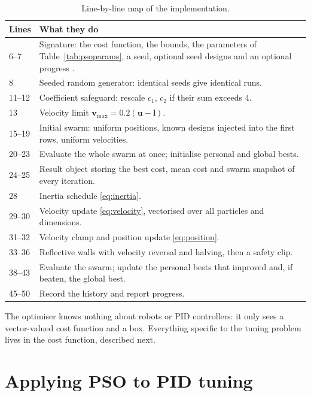 \documentclass[11pt,a4paper]{article}
\newcommand{\code}[1]{\texttt{\detokenize{#1}}}
\begin{document}
\begin{table}[H]
\centering
\small
\begin{tabularx}{\linewidth}{@{}l X@{}}
\toprule
\textbf{Lines} & \textbf{What they do}\\
\midrule
6--7 & Signature: the cost function, the bounds, the parameters of Table~\ref{tab:psoparams}, a seed, optional seed designs \code{x0} and an optional progress \code{callback}.\\
8 & Seeded random generator: identical seeds give identical runs.\\
11--12 & Coefficient safeguard: rescale $c_1$, $c_2$ if their sum exceeds 4.\\
13 & Velocity limit $\bm v_{\max} = 0.2(\bm u - \bm l)$.\\
15--19 & Initial swarm: uniform positions, known designs injected into the first rows, uniform velocities.\\
20--23 & Evaluate the whole swarm at once; initialise personal and global bests.\\
24--25 & Result object storing the best cost, mean cost and swarm snapshot of every iteration.\\
28 & Inertia schedule \eqref{eq:inertia}.\\
29--30 & Velocity update \eqref{eq:velocity}, vectorised over all particles and dimensions.\\
31--32 & Velocity clamp and position update \eqref{eq:position}.\\
33--36 & Reflective walls with velocity reversal and halving, then a safety clip.\\
38--43 & Evaluate the swarm; update the personal bests that improved and, if beaten, the global best.\\
45--50 & Record the history and report progress.\\
\bottomrule
\end{tabularx}
\caption{Line-by-line map of the implementation.}
\end{table}

The optimiser knows nothing about robots or PID controllers: it only sees a vector-valued cost function and
a box. Everything specific to the tuning problem lives in the cost function, described next.

\section{Applying PSO to PID tuning}
\label{sec:application}
\end{document}
